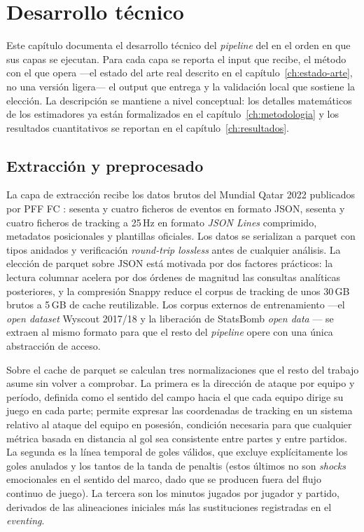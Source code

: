 \chapter{Desarrollo técnico}
\label{ch:desarrollo}

Este capítulo documenta el desarrollo técnico del \textit{pipeline} del
\CCV en el orden en que sus capas se ejecutan. Para cada capa se reporta
el input que recibe, el método con el que opera ---el estado del arte
real descrito en el capítulo~\ref{ch:estado-arte}, no una versión ligera---
el output que entrega y la validación local que sostiene la elección.
La descripción se mantiene a nivel conceptual: los detalles
matemáticos de los estimadores ya están formalizados en el
capítulo~\ref{ch:metodologia} y los resultados cuantitativos se reportan
en el capítulo~\ref{ch:resultados}.


\section{Extracción y preprocesado}
\label{sec:extraccion-preprocesado}

La capa de extracción recibe los datos brutos del Mundial Qatar 2022
publicados por PFF FC \parencite{PFFFC2024Release}: sesenta y cuatro
ficheros de eventos en formato JSON, sesenta y cuatro ficheros de
tracking a 25\,Hz en formato \textit{JSON Lines} comprimido,
metadatos posicionales y plantillas oficiales. Los datos se serializan
a parquet con tipos anidados y verificación \textit{round-trip
lossless} antes de cualquier análisis. La elección de parquet sobre
JSON está motivada por dos factores prácticos: la lectura columnar
acelera por dos órdenes de magnitud las consultas analíticas posteriores,
y la compresión Snappy reduce el corpus de tracking de unos 30\,GB
brutos a 5\,GB de cache reutilizable. Los corpus externos
de entrenamiento ---el \textit{open dataset} Wyscout 2017/18
\parencite{Pappalardo2019Wyscout} y la liberación de StatsBomb
\textit{open data} \parencite{StatsBombOpenData}--- se extraen al mismo
formato para que el resto del \textit{pipeline} opere con una única
abstracción de acceso.

Sobre el cache de parquet se calculan tres normalizaciones que el resto
del trabajo asume sin volver a comprobar. La primera es la dirección
de ataque por equipo y período, definida como el sentido del campo
hacia el que cada equipo dirige su juego en cada parte; permite
expresar las coordenadas de tracking en un sistema relativo al ataque
del equipo en posesión, condición necesaria para que cualquier métrica
basada en distancia al gol sea consistente entre partes y entre
partidos. La segunda es la línea temporal de goles válidos, que
excluye explícitamente los goles anulados y los tantos de la tanda de
penaltis (estos últimos no son \textit{shocks} emocionales en el sentido del
marco, dado que se producen fuera del flujo continuo de juego). La
tercera son los minutos jugados por jugador y partido, derivados de
las alineaciones iniciales más las sustituciones registradas en el
\textit{eventing}.

